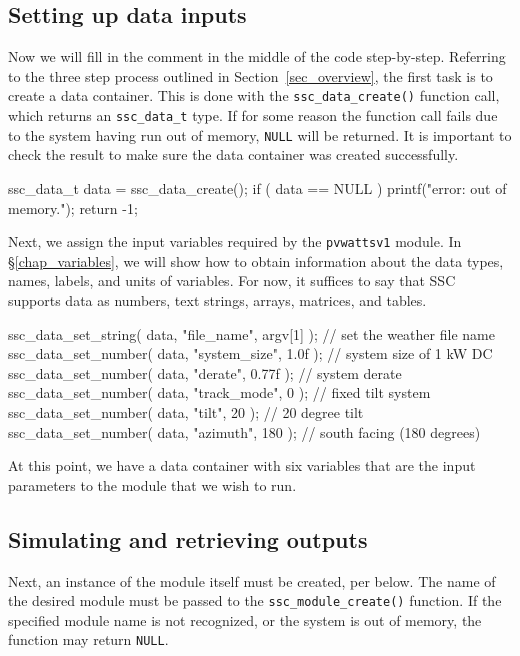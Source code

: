 \documentclass{article}
\begin{document}
\subsection{Setting up data inputs}

Now we will fill in the comment in the middle of the code step-by-step.  Referring to the three step process outlined in Section~\ref{sec_overview}, the first task is to create a data container.  This is done with the \texttt{ssc\_data\_create()} function call, which returns an \texttt{ssc\_data\_t} type.  If for some reason the function call fails due to the system having run out of memory, \texttt{NULL} will be returned.  It is important to check the result to make sure the data container was created successfully.

\begin{verbatimtab}[4]
	ssc_data_t data = ssc_data_create();
	if ( data == NULL )
	{
		printf("error: out of memory.\n");
		return -1;
	}
\end{verbatimtab}

Next, we assign the input variables required by the \texttt{pvwattsv1} module.  In \S\ref{chap_variables}, we will show how to obtain information about the data types, names, labels, and units of variables.  For now, it suffices to say that SSC supports data as numbers, text strings, arrays, matrices, and tables.

\begin{verbatimtab}[4]
	ssc_data_set_string( data, "file_name", argv[1] ); // set the weather file name
	ssc_data_set_number( data, "system_size", 1.0f );  // system size of 1 kW DC
	ssc_data_set_number( data, "derate", 0.77f );      // system derate
	ssc_data_set_number( data, "track_mode", 0 );      // fixed tilt system
	ssc_data_set_number( data, "tilt", 20 );           // 20 degree tilt
	ssc_data_set_number( data, "azimuth", 180 );       // south facing (180 degrees)
\end{verbatimtab}

At this point, we have a data container with six variables that are the input parameters to the module that we wish to run.  

\subsection{Simulating and retrieving outputs}
\label{sec_ex_pvwatts_module}

Next, an instance of the module itself must be created, per below.  The name of the desired module must be passed to the \texttt{ssc\_module\_create()} function.  If the specified module name is not recognized, or the system is out of memory, the function may return \texttt{NULL}.
\end{document}
